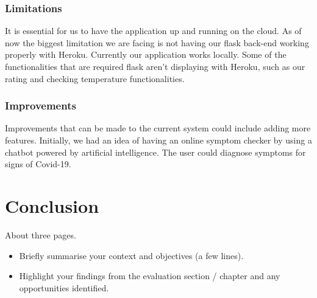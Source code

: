 \subsection{Limitations}
It is essential for us to have the application up and running on the cloud. As of now the biggest limitation we are facing is not having our flask back-end working properly with Heroku. 
Currently our application works locally. Some of the functionalities that are required flask aren't displaying with Heroku, such as our rating and checking temperature functionalities.


\subsection{Improvements}
Improvements that can be made to the current system could include adding more features. Initially, we had an idea of having an online symptom checker by using a chatbot powered by artificial intelligence. The user could diagnose symptoms for signs of Covid-19.


\chapter{Conclusion}
About three pages.

\begin{itemize}
\item Briefly summarise your context and objectives (a few lines).
\item Highlight your findings from the evaluation section / chapter and any opportunities identified.
\end{itemize}

